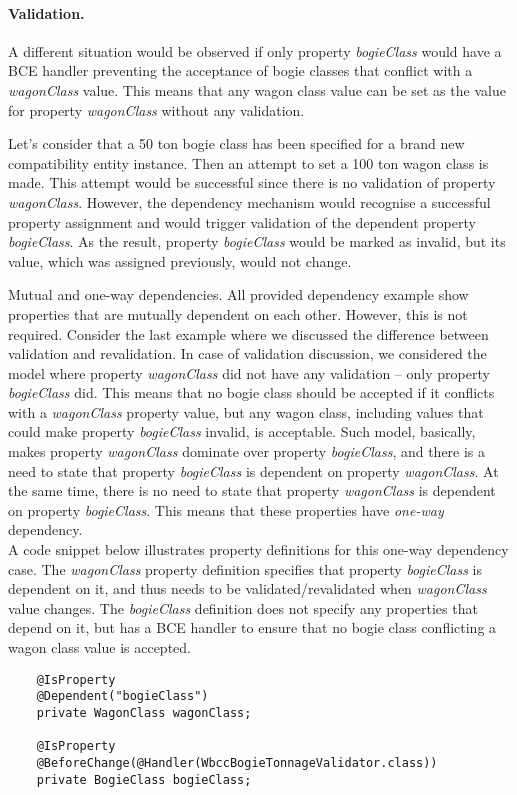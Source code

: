   \paragraph*{Validation.}
  A different situation would be observed if only property \emph{bogieClass} would have a BCE handler preventing the acceptance of bogie classes that conflict with a \emph{wagonClass} value.
  This means that any wagon class value can be set as the value for property \emph{wagonClass} without any validation.
  
  Let's consider that a 50 ton bogie class has been specified for a brand new compatibility entity instance.
  Then an attempt to set a 100 ton wagon class is made.
  This attempt would be successful since there is no validation of property \emph{wagonClass}.
  However, the dependency mechanism would recognise a successful property assignment and would trigger validation of the dependent property \emph{bogieClass}.
  As the result, property \emph{bogieClass} would be marked as invalid, but its value, which was assigned previously, would not change.
  
  \begin{notebox}{Mutual and one-way dependencies.}{\label{nb:MutialDependencyOrNot}}
    All provided dependency example show properties that are mutually dependent on each other.
    However, this is not required.
    Consider the last example where we discussed the difference between validation and revalidation.
    In case of validation discussion, we considered the model where property \emph{wagonClass} did not have any validation -- only property \emph{bogieClass} did.
    This means that no bogie class should be accepted if it conflicts with a \emph{wagonClass} property value, but any wagon class, including values that could make property \emph{bogieClass} invalid, is acceptable.
    Such model, basically, makes property \emph{wagonClass} dominate over property \emph{bogieClass}, and there is a need to state that property \emph{bogieClass} is dependent on property \emph{wagonClass}.
    At the same time, there is no need to state that property \emph{wagonClass} is dependent on property \emph{bogieClass}.    
    This means that these properties have \emph{one-way} dependency.\\

    A code snippet below illustrates property definitions for this one-way dependency case.
    The \emph{wagonClass} property definition specifies that property \emph{bogieClass} is dependent on it, and thus needs to be validated/revalidated when \emph{wagonClass} value changes.
    The \emph{bogieClass} definition does not specify any properties that depend on it, but has a BCE handler to ensure that no bogie class conflicting a wagon class value is accepted.

    \begin{lstlisting}
    @IsProperty
    @Dependent("bogieClass")
    private WagonClass wagonClass;

    @IsProperty
    @BeforeChange(@Handler(WbccBogieTonnageValidator.class))
    private BogieClass bogieClass;
    \end{lstlisting}
  
  \end{notebox}

